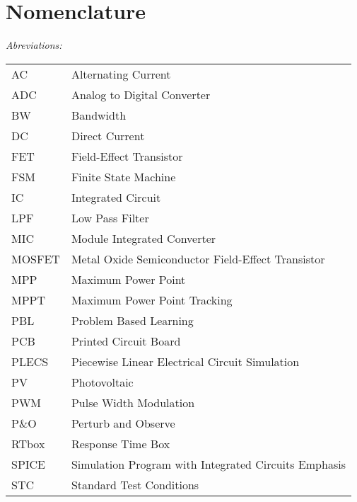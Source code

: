 \chapter*{Nomenclature}

\vspace{-10mm} %
\textit{Abreviations:}\newline
\begin{tabular}{ll} %
AC & Alternating Current\\
ADC & Analog to Digital Converter \\
BW & Bandwidth \\
DC & Direct Current\\
FET & Field-Effect Transistor\\
FSM & Finite State Machine \\
IC & Integrated Circuit\\
LPF & Low Pass Filter\\
MIC & Module Integrated Converter\\
MOSFET & Metal Oxide Semiconductor Field-Effect Transistor\\
MPP & Maximum Power Point\\
MPPT & Maximum Power Point Tracking\\
PBL & Problem Based Learning\\
PCB & Printed Circuit Board\\
PLECS & Piecewise Linear Electrical Circuit Simulation\\
PV & Photovoltaic\\
PWM & Pulse Width Modulation\\
P\&O & Perturb and Observe\\
RTbox & Response Time Box \\
SPICE & Simulation Program with Integrated Circuits Emphasis \\
STC & Standard Test Conditions\\
\end{tabular}

